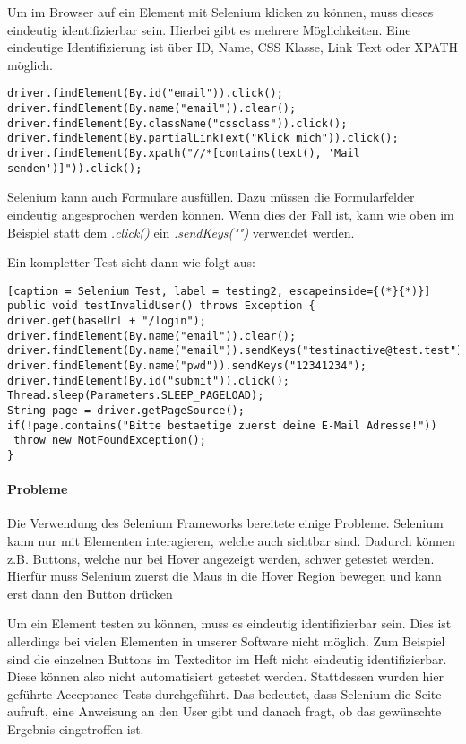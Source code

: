 Um im Browser auf ein Element mit Selenium klicken zu können, muss dieses eindeutig identifizierbar sein. Hierbei gibt es mehrere Möglichkeiten. Eine eindeutige Identifizierung ist über ID, Name, CSS Klasse, Link Text oder \gls{XPATH} möglich. \cite{SELENIUMID}

\begin{lstlisting}[caption = Selenium Element Selektoren, label = testing1]
driver.findElement(By.id("email")).click();
driver.findElement(By.name("email")).clear();
driver.findElement(By.className("cssclass")).click();
driver.findElement(By.partialLinkText("Klick mich")).click();
driver.findElement(By.xpath("//*[contains(text(), 'Mail senden')]")).click();
\end{lstlisting}

Selenium kann auch Formulare ausfüllen. Dazu müssen die Formularfelder eindeutig angesprochen werden können. Wenn dies der Fall ist, kann wie oben im Beispiel statt dem \textit{.click()} ein \textit{.sendKeys("")} verwendet werden. 

\newpage

Ein kompletter Test sieht dann wie folgt aus:
\begin{lstlisting}[caption = Selenium Test, label = testing2, escapeinside={(*}{*)}]
public void testInvalidUser() throws Exception {
driver.get(baseUrl + "/login");
driver.findElement(By.name("email")).clear();
driver.findElement(By.name("email")).sendKeys("testinactive@test.test");
driver.findElement(By.name("pwd")).sendKeys("12341234");
driver.findElement(By.id("submit")).click();
Thread.sleep(Parameters.SLEEP_PAGELOAD);
String page = driver.getPageSource();
if(!page.contains("Bitte bestaetige zuerst deine E-Mail Adresse!"))
 throw new NotFoundException();
}
\end{lstlisting}

\paragraph{Probleme}
Die Verwendung des Selenium Frameworks bereitete einige Probleme. Selenium kann nur mit Elementen interagieren, welche auch sichtbar sind. Dadurch können z.B. Buttons, welche nur bei Hover angezeigt werden, schwer getestet werden. Hierfür muss Selenium zuerst die Maus in die Hover Region bewegen und kann erst dann den Button drücken 

Um ein Element testen zu können, muss es eindeutig identifizierbar sein. Dies ist allerdings bei vielen Elementen in unserer Software nicht möglich. Zum Beispiel sind die einzelnen Buttons im Texteditor im Heft nicht eindeutig identifizierbar. Diese können also nicht automatisiert getestet werden. Stattdessen wurden hier geführte Acceptance Tests durchgeführt. Das bedeutet, dass Selenium die Seite aufruft, eine Anweisung an den User gibt und danach fragt, ob das gewünschte Ergebnis eingetroffen ist. 

